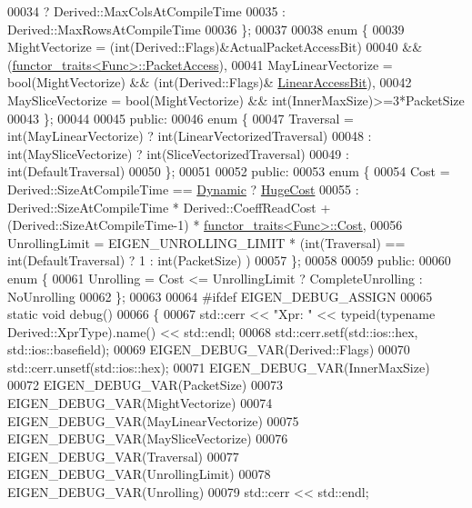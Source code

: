 \begin{DoxyCode}
00034                  ? Derived::MaxColsAtCompileTime
00035                  : Derived::MaxRowsAtCompileTime
00036   \};
00037 
00038   \textcolor{keyword}{enum} \{
00039     MightVectorize = (int(Derived::Flags)&ActualPacketAccessBit)
00040                   && (\hyperlink{struct_eigen_1_1internal_1_1functor__traits}{functor\_traits<Func>::PacketAccess}),
00041     MayLinearVectorize = bool(MightVectorize) && (int(Derived::Flags)&
      \hyperlink{group__flags_ga4b983a15d57cd55806df618ac544d09e}{LinearAccessBit}),
00042     MaySliceVectorize  = \textcolor{keywordtype}{bool}(MightVectorize) && int(InnerMaxSize)>=3*PacketSize
00043   \};
00044 
00045 \textcolor{keyword}{public}:
00046   \textcolor{keyword}{enum} \{
00047     Traversal = int(MayLinearVectorize) ? int(LinearVectorizedTraversal)
00048               : int(MaySliceVectorize)  ? int(SliceVectorizedTraversal)
00049                                         : int(DefaultTraversal)
00050   \};
00051 
00052 \textcolor{keyword}{public}:
00053   \textcolor{keyword}{enum} \{
00054     Cost = Derived::SizeAtCompileTime == \hyperlink{namespace_eigen_ad81fa7195215a0ce30017dfac309f0b2}{Dynamic} ? \hyperlink{namespace_eigen_a3163430a1c13173faffde69016b48aaf}{HugeCost}
00055          : Derived::SizeAtCompileTime * Derived::CoeffReadCost + (Derived::SizeAtCompileTime-1) * 
      \hyperlink{struct_eigen_1_1internal_1_1functor__traits}{functor\_traits<Func>::Cost},
00056     UnrollingLimit = EIGEN\_UNROLLING\_LIMIT * (\textcolor{keywordtype}{int}(Traversal) == int(DefaultTraversal) ? 1 : int(PacketSize)
      )
00057   \};
00058 
00059 \textcolor{keyword}{public}:
00060   \textcolor{keyword}{enum} \{
00061     Unrolling = Cost <= UnrollingLimit ? CompleteUnrolling : NoUnrolling
00062   \};
00063   
00064 \textcolor{preprocessor}{#ifdef EIGEN\_DEBUG\_ASSIGN}
00065   \textcolor{keyword}{static} \textcolor{keywordtype}{void} debug()
00066   \{
00067     std::cerr << \textcolor{stringliteral}{"Xpr: "} << \textcolor{keyword}{typeid}(\textcolor{keyword}{typename} Derived::XprType).name() << std::endl;
00068     std::cerr.setf(std::ios::hex, std::ios::basefield);
00069     EIGEN\_DEBUG\_VAR(Derived::Flags)
00070     std::cerr.unsetf(std::ios::hex);
00071     EIGEN\_DEBUG\_VAR(InnerMaxSize)
00072     EIGEN\_DEBUG\_VAR(PacketSize)
00073     EIGEN\_DEBUG\_VAR(MightVectorize)
00074     EIGEN\_DEBUG\_VAR(MayLinearVectorize)
00075     EIGEN\_DEBUG\_VAR(MaySliceVectorize)
00076     EIGEN\_DEBUG\_VAR(Traversal)
00077     EIGEN\_DEBUG\_VAR(UnrollingLimit)
00078     EIGEN\_DEBUG\_VAR(Unrolling)
00079     std::cerr << std::endl;

\end{DoxyCode}
